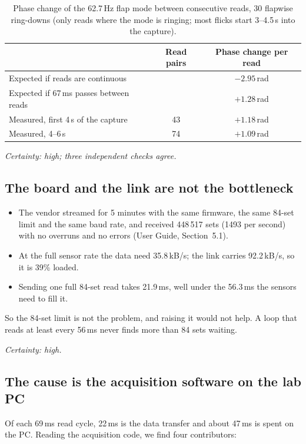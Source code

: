 \documentclass[11pt]{article}
\begin{document}
\begin{table}[H]
  \centering
  \begin{tabular}{lcc}
    \toprule
    & Read pairs & Phase change per read \\
    \midrule
    Expected if reads are continuous & & $-2.95$\,rad \\
    Expected if 67\,ms passes between reads & & $+1.28$\,rad \\
    Measured, first 4\,s of the capture & 43 & $+1.18$\,rad \\
    Measured, 4--6\,s & 74 & $+1.09$\,rad \\
    \bottomrule
  \end{tabular}
  \caption{Phase change of the 62.7\,Hz flap mode between consecutive reads,
  30 flapwise ring-downs (only reads where the mode is ringing; most flicks
  start 3--4.5\,s into the capture).}
  \label{tab:phase}
\end{table}

\textit{Certainty: high; three independent checks agree.}

\subsection{The board and the link are not the bottleneck}

\begin{itemize}
  \item The vendor streamed for 5 minutes with the same firmware, the same
        84-set limit and the same baud rate, and received 448\,517 sets (1493
        per second) with no overruns and no errors (User Guide, Section~5.1).
  \item At the full sensor rate the data need 35.8\,kB/s; the link carries
        92.2\,kB/s, so it is 39\% loaded.
  \item Sending one full 84-set read takes 21.9\,ms, well under the 56.3\,ms
        the sensors need to fill it.
\end{itemize}
So the 84-set limit is not the problem, and raising it would not help. A
loop that reads at least every 56\,ms never finds more than 84 sets waiting.

\textit{Certainty: high.}

\subsection{The cause is the acquisition software on the lab PC}

Of each 69\,ms read cycle, 22\,ms is the data transfer and about 47\,ms is
spent on the PC. Reading the acquisition code, we find four contributors:
\end{document}
